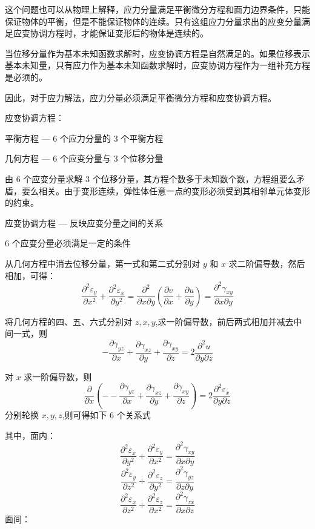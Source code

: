 \documentclass[12pt,a4paper]{article}
\begin{document}
这个问题也可以从物理上解释，应力分量满足平衡微分方程和面力边界条件，只能保证物体的平衡，但是不能保证物体的连续。只有这组应力分量求出的应变分量满足应变协调方程时，才能保证变形后的物体是连续的。

当位移分量作为基本未知函数求解时，应变协调方程是自然满足的。如果位移表示基本未知量，只有应力作为基本未知函数求解时，应变协调方程作为一组补充方程是必须的。

因此，对于应力解法，应力分量必须满足平衡微分方程和应变协调方程。

$\textbf{应变协调方程}$：

平衡方程 — $6$ 个应力分量的 $3$ 个平衡方程

几何方程 — $6$ 个应变分量与 $3$ 个位移分量

由 $6$ 个应变分量求解 $3$ 个位移分量，其方程个数多于未知数个数，方程组要么矛盾，要么相关。由于变形连续，弹性体任意一点的变形必须受到其相邻单元体变形的约束。

应变协调方程 — 反映应变分量之间的关系

$6$ 个应变分量必须满足一定的条件

从几何方程中消去位移分量，第一式和第二式分别对 $y$ 和 $x$ 求二阶偏导数，然后相加，可得：
$$
\frac{\partial^2 \varepsilon_y}{\partial x^2}+\frac{\partial^2 \varepsilon_x}{\partial y^2}=\frac{\partial^2}{\partial x\partial y}(\frac{\partial v}{\partial x}+\frac{\partial u}{\partial y})=\frac{\partial^2 \gamma_{xy}}{\partial x\partial y}
$$

将几何方程的四、五、六式分别对 $z,x,y$,求一阶偏导数，前后两式相加并减去中间一式，则
$$
-\frac{\partial\gamma_{yz}}{\partial x}+\frac{\partial\gamma_{xz}}{\partial y}+\frac{\partial\gamma_{xy}}{\partial z}=2\frac{\partial^2 u}{\partial y\partial z}
$$

对 $x$ 求一阶偏导数，则
$$
\frac{\partial}{\partial x}(--\frac{\partial\gamma_{yz}}{\partial x}+\frac{\partial\gamma_{xz}}{\partial y}+\frac{\partial\gamma_{xy}}{\partial z})=2\frac{\partial^2 \varepsilon_x}{\partial y\partial z}
$$
分别轮换 $x,y,z$,则可得如下 $6$ 个关系式

其中，面内：
$$
\frac{\partial^2 \varepsilon_x}{\partial y^2}+\frac{\partial^2 \varepsilon_y}{\partial x^2}=\frac{\partial^2 \gamma_{xy}}{\partial x\partial y}
$$
$$
\frac{\partial^2 \varepsilon_y}{\partial z^2}+\frac{\partial^2 \varepsilon_z}{\partial y^2}=\frac{\partial^2 \gamma_{yz}}{\partial z\partial y}
$$
$$
\frac{\partial^2 \varepsilon_x}{\partial z^2}+\frac{\partial^2 \varepsilon_z}{\partial x^2}=\frac{\partial^2 \gamma_{zx}}{\partial x\partial z}
$$
面间：
\end{document}

